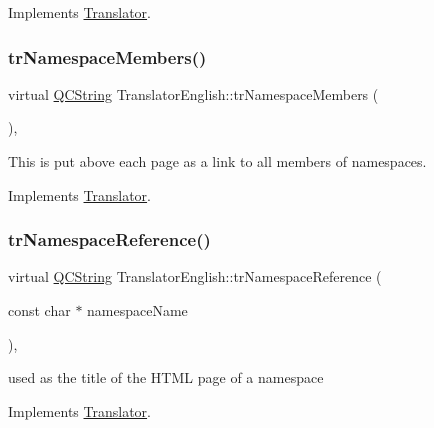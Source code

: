 Implements \mbox{\hyperlink{class_translator}{Translator}}.

\mbox{\label{class_translator_english_a1cc31252d090b28c84108707ec5ed943}} 
\subsubsection{\texorpdfstring{trNamespaceMembers()}{trNamespaceMembers()}}
{\footnotesize\ttfamily virtual \mbox{\hyperlink{class_q_c_string}{Q\+C\+String}} Translator\+English\+::tr\+Namespace\+Members (\begin{DoxyParamCaption}{ }\end{DoxyParamCaption})\hspace{0.3cm}{\ttfamily [inline]}, {\ttfamily [virtual]}}

This is put above each page as a link to all members of namespaces. 

Implements \mbox{\hyperlink{class_translator}{Translator}}.

\mbox{\label{class_translator_english_adbe93d17f7f3a3a13212763b7641f7f9}} 
\subsubsection{\texorpdfstring{trNamespaceReference()}{trNamespaceReference()}}
{\footnotesize\ttfamily virtual \mbox{\hyperlink{class_q_c_string}{Q\+C\+String}} Translator\+English\+::tr\+Namespace\+Reference (\begin{DoxyParamCaption}\item[{const char $\ast$}]{namespace\+Name }\end{DoxyParamCaption})\hspace{0.3cm}{\ttfamily [inline]}, {\ttfamily [virtual]}}

used as the title of the H\+T\+ML page of a namespace 

Implements \mbox{\hyperlink{class_translator}{Translator}}.

\mbox{\label{class_translator_english_a91b920d63dcceb26923b2a4e30cf0f14}} 
